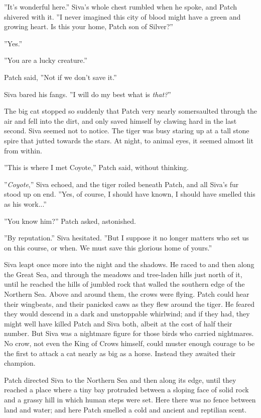 \documentclass[12pt]{book}
\begin{document}
''It's wonderful here.'' Siva's whole chest rumbled when he spoke, and Patch shivered with it. ''I never imagined this city of blood might have a green and growing heart. Is this your home, Patch son of Silver?''

''Yes.''

''You are a lucky creature.''

Patch said, ''Not if we don't save it.''

Siva bared his fangs. ''I will do my best %
what is {\it that?}''

The big cat stopped so suddenly that Patch very nearly somersaulted through the air and fell into the dirt, and only saved himself by clawing hard in the last second. Siva seemed not to notice. The tiger was busy staring up at a tall stone spire that jutted towards the stars. At night, to animal eyes, it seemed almost lit from within.

''This is where I met Coyote,'' Patch said, without thinking.

''{\it Coyote},'' Siva echoed, and the tiger roiled beneath Patch, and all Siva's fur stood up on end. ''Yes, of course, I should have known, I should have smelled this as his work...''

''You know him?'' Patch asked, astonished.

''By reputation.'' Siva hesitated. ''But I suppose it no longer matters who set us on this course, or when. We must save this glorious home of yours.''

Siva leapt once more into the night and the shadows. He raced to and then along the Great Sea, and through the meadows and tree-laden hills just north of it, until he reached the hills of jumbled rock that walled the southern edge of the Northern Sea. Above and around them, the crows were flying. Patch could hear their wingbeats, and their panicked caws as they flew around the tiger. He feared they would descend in a dark and unstoppable whirlwind; and if they had, they might well have killed Patch and Siva both, albeit at the cost of half their number. But Siva was a nightmare figure for those birds who carried nightmares. No crow, not even the King of Crows himself, could muster enough courage to be the first to attack a cat nearly as big as a horse. Instead they awaited their champion.

Patch directed Siva to the Northern Sea and then along its edge, until they reached a place where a tiny bay protruded between a sloping face of solid rock and a grassy hill in which human steps were set. Here there was no fence between land and water; and here Patch smelled a cold and ancient and reptilian scent.
\end{document}
